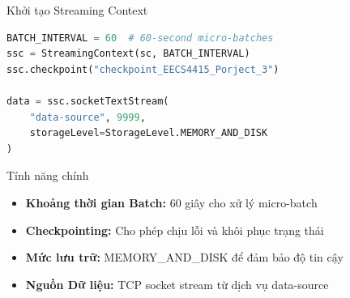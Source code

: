 \documentclass[aspectratio=169]{beamer}
\begin{document}
\begin{frame}{Khởi tạo Streaming Context}
    \begin{lstlisting}[language=Python]
BATCH_INTERVAL = 60  # 60-second micro-batches
ssc = StreamingContext(sc, BATCH_INTERVAL)
ssc.checkpoint("checkpoint_EECS4415_Porject_3")

data = ssc.socketTextStream(
    "data-source", 9999,
    storageLevel=StorageLevel.MEMORY_AND_DISK
)
    \end{lstlisting}
    
    \vspace{0.3cm}
    \begin{block}{Tính năng chính}
        \begin{itemize}
            \item \textbf{Khoảng thời gian Batch:} 60 giây cho xử lý micro-batch
            \item \textbf{Checkpointing:} Cho phép chịu lỗi và khôi phục trạng thái
            \item \textbf{Mức lưu trữ:} MEMORY\_AND\_DISK để đảm bảo độ tin cậy
            \item \textbf{Nguồn Dữ liệu:} TCP socket stream từ dịch vụ data-source
        \end{itemize}
    \end{block}
\end{frame}
\end{document}
